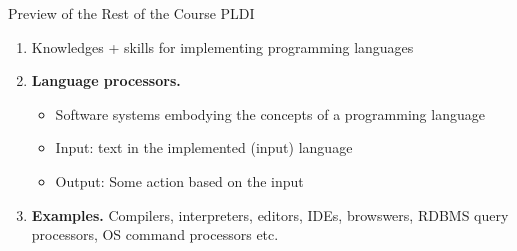 \documentclass{beamer}
\begin{document}
\begin{frame}{Preview of the Rest of the Course}
{PLDI}

\begin{enumerate}
\item Knowledges + skills for implementing  programming languages
\item \textbf{Language processors.}
	\begin{itemize}
	\item Software systems embodying the concepts of a programming language
	\item Input: text in the implemented (input) language
	\item Output: Some action based on the input 
	\end{itemize}
\item \textbf{Examples.} Compilers, interpreters, editors, IDEs, browswers, RDBMS query processors, OS command processors etc.
\end{enumerate}

\end{frame}
\end{document}
